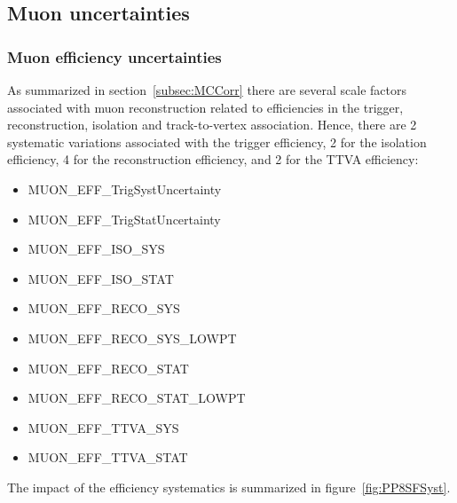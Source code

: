 \subsection{Muon uncertainties}
\label{sec:muonuncerts}

\subsubsection{Muon efficiency uncertainties}
As summarized in section~\ref{subsec:MCCorr} there are several scale factors associated with muon reconstruction related to efficiencies in the trigger, reconstruction, isolation and track-to-vertex association.
Hence, there are 2 systematic variations associated with the trigger efficiency, 2 for the isolation efficiency, 4 for the reconstruction efficiency, and 2 for the TTVA efficiency:
\begin{itemize}
  \setlength{\itemsep}{1pt}\setlength{\parskip}{0pt}\setlength{\parsep}{0pt}
  \item MUON\_EFF\_TrigSystUncertainty
  \item MUON\_EFF\_TrigStatUncertainty
  \item MUON\_EFF\_ISO\_SYS
  \item MUON\_EFF\_ISO\_STAT
  \item MUON\_EFF\_RECO\_SYS
  \item MUON\_EFF\_RECO\_SYS\_LOWPT
  \item MUON\_EFF\_RECO\_STAT
  \item MUON\_EFF\_RECO\_STAT\_LOWPT
  \item MUON\_EFF\_TTVA\_SYS
  \item MUON\_EFF\_TTVA\_STAT
\end{itemize}

The impact of the efficiency systematics is summarized in figure~\ref{fig:PP8SFSyst}.

